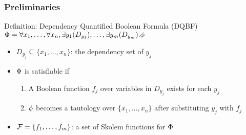 \begin{frame}
      \frametitle{Preliminaries}
      \begin{block}{Definition: Dependency Quantified Boolean Formula (DQBF)}
            $\Phi=\forall x_1, \ldots, \forall x_n, \exists y_1(D_{y_1}), \ldots, \exists y_m(D_{y_m}).\phi$
            \begin{itemize}
                  \item $D_{y_j} \subseteq \{x_1,\ldots,x_n\}$: the \alert{dependency set} of $y_j$
                  \item $\Phi$ is satisfiable if
                        \begin{enumerate}
                              \item A Boolean function $f_j$ over variables in $D_{y_j}$ exists for each $y_j$
                              \item $\phi$ becomes a tautology over $\{x_1,\ldots,x_n\}$ after substituting $y_j$ with $f_j$
                        \end{enumerate}
                  \item $\mathcal{F}=\{f_1,\ldots,f_m\}$: a set of Skolem functions for $\Phi$
            \end{itemize}
      \end{block}
\end{frame}